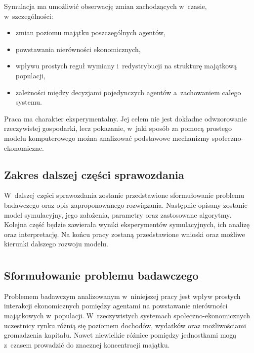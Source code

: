\documentclass[polish]{projectreport}
\begin{document}
Symulacja ma umo\.{z}liwi\'{c} obserwacj\k{e} zmian zachodz\k{a}cych w~czasie, w~szczeg\'olno\'sci:
\begin{itemize}
  \item zmian poziomu maj\k{a}tku poszczeg\'olnych agent\'ow,
  \item powstawania nier\'owno\'sci ekonomicznych,
  \item wp\l{}ywu prostych regu\l{} wymiany i~redystrybucji na struktur\k{e} maj\k{a}tkow\k{a} populacji,
  \item zale\.{z}no\'sci mi\k{e}dzy decyzjami pojedynczych agent\'ow a~zachowaniem ca\l{}ego systemu.
\end{itemize}

Praca ma charakter eksperymentalny. Jej celem nie jest dok\l{}adne odwzorowanie
rzeczywistej gospodarki, lecz pokazanie, w~jaki spos\'ob za pomoc\k{a} prostego modelu
komputerowego mo\.{z}na analizowa\'{c} podstawowe mechanizmy spo\l{}eczno-ekonomiczne.

\subsection{Zakres dalszej cz\k{e}\'sci sprawozdania}
\label{sec:scope}

W~dalszej cz\k{e}\'sci sprawozdania zostanie przedstawione sformu\l{}owanie problemu badawczego
oraz opis zaproponowanego rozwi\k{a}zania. Nast\k{e}pnie opisany zostanie model symulacyjny,
jego za\l{}o\.{z}enia, parametry oraz zastosowane algorytmy. Kolejna cz\k{e}\'s\'{c} b\k{e}dzie zawiera\l{}a
wyniki eksperyment\'ow symulacyjnych, ich analiz\k{e} oraz interpretacj\k{e}. Na ko\'ncu pracy
zostan\k{a} przedstawione wnioski oraz mo\.{z}liwe kierunki dalszego rozwoju modelu.

\section{\SectionTitleProblemSolution}
\label{sec:solution}

\subsection{Sformu\l{}owanie problemu badawczego}
\label{sec:problem}

Problemem badawczym analizowanym w~niniejszej pracy jest wp\l{}yw prostych interakcji
ekonomicznych pomi\k{e}dzy agentami na powstawanie nier\'owno\'sci maj\k{a}tkowych w~populacji.
W~rzeczywistych systemach spo\l{}eczno-ekonomicznych uczestnicy rynku r\'o\.{z}ni\k{a} si\k{e}
poziomem dochod\'ow, wydatk\'ow oraz mo\.{z}liwo\'sciami gromadzenia kapita\l{}u. Nawet niewielkie
r\'o\.{z}nice pomi\k{e}dzy jednostkami mog\k{a} z~czasem prowadzi\'{c} do znacznej koncentracji maj\k{a}tku.
\end{document}
